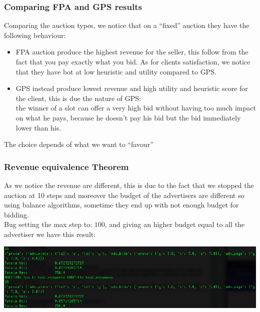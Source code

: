 \documentclass{beamer}
\begin{document}
\begin{frame}
\frametitle{Comparing FPA and GPS results}
Comparing the auction types, we notice that on a ``fixed'' auction they have the following behaviour:
\begin{itemize}
\item FPA auction produce the \alert{highest} revenue for the seller, this follow from the fact that you pay exactly what you bid. As for clients satisfaction, we notice that they have bot at \alert{low} heuristic and  utility compared to GPS.
\item GPS instead produce \alert{lowest} revenue and \alert{high} utility and heuristic score for the client, this is due the nature of GPS:\\
the winner of a slot can offer a very high bid without having too much impact on what he pays, because he doesn't pay his bid but the bid immediately lower than his.
\end{itemize}
The choice depends of what we want  to ``favour''
\end{frame}

\begin{frame}
\frametitle{Revenue equivalence Theorem}
As we notice the revenue are different, this is due to the fact that we stopped the auction at 10 steps and moreover the budget of the advertisers are different so using balance algorithms, sometime they end up with not enough budget for bidding.\\
\medskip
Bug setting the max step to: $100$, and giving an higher budget equal to all the advertiser we have this result:
\begin{center}
\includegraphics[scale=0.37]{img/revenuetheorem.png} 
\end{center}
\end{frame}
\end{document}

